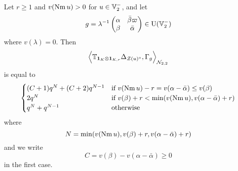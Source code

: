 \begin{theorem}
  Let $r \ge 1$ and $v(\operatorname{Nm} u) > 0$ for $u \in \mathbb V_2^-$, and let
  \[ g = \lambda^{-1}
    \begin{pmatrix} \alpha & \bar\beta \varpi \\ \beta & \bar\alpha \end{pmatrix}
    \in \operatorname{U}(\mathbb V_2^-) \]
  where $v(\lambda) = 0$.
  Then
  \[ \Big\langle \mathbb{T}_{\mathbf{1}_K \otimes \mathbf{1}_{K, r}}
    \Delta_{\mathcal Z(u)^\circ}, \Gamma_g \Big\rangle_{\mathcal N_{2,2}} \]
  is equal to
  \[
    \begin{cases}
      (C+1) q^{N} + (C+2) q^{N-1}
        & \text{if } v(\operatorname{Nm} u)-r = v(\alpha - \bar\alpha) \le v(\beta) \\
      2q^N & \text{if } v(\beta) + r < \min(v(\operatorname{Nm} u), v(\alpha - \bar\alpha) + r) \\
      q^N + q^{N-1} & \text{otherwise}
    \end{cases}
  \]
  where
  \[ N = \min(v(\operatorname{Nm} u), v(\beta) + r, v(\alpha-\bar\alpha) + r) \]
  and we write
  \[ C = v(\beta) - v(\alpha - \bar\alpha) \ge 0 \]
  in the first case.
\end{theorem}

